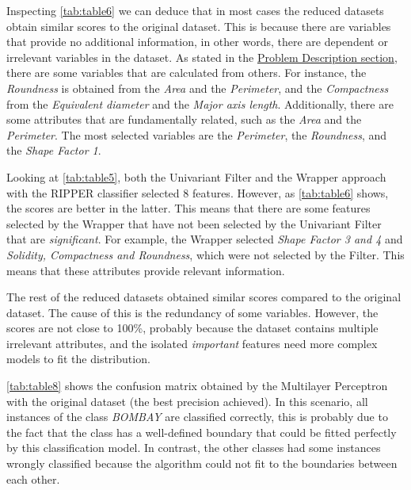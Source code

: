 \documentclass[a4paper,11pt]{article}
\begin{document}
Inspecting \autoref{tab:table6} we can deduce that in most cases the reduced datasets obtain similar scores to the original dataset. This is because there are variables that provide no additional information, in other words, there are dependent or irrelevant variables in the dataset. As stated in the \hyperref[sec:problem]{Problem Description section}, there are some variables that are calculated from others. For instance, the \textit{Roundness} is obtained from the \textit{Area} and the \textit{Perimeter}, and the \textit{Compactness} from the \textit{Equivalent diameter} and the \textit{Major axis length}. Additionally, there are some attributes that are fundamentally related, such as the \textit{Area} and the \textit{Perimeter}. The most selected variables are the \textit{Perimeter}, the \textit{Roundness}, and the \textit{Shape Factor 1}.

Looking at \autoref{tab:table5}, both the Univariant Filter and the Wrapper approach with the RIPPER classifier selected 8 features. However, as \autoref{tab:table6} shows, the scores are better in the latter. This means that there are some features selected by the Wrapper that have not been selected by the Univariant Filter that are \textit{significant}. For example, the Wrapper selected \textit{Shape Factor 3 and 4} and \textit{Solidity, Compactness and Roundness}, which were not selected by the Filter. This means that these attributes provide relevant information.

The rest of the reduced datasets obtained similar scores compared to the original dataset. The cause of this is the redundancy of some variables. However, the scores are not close to 100\%, probably because the dataset contains multiple irrelevant attributes, and the isolated \textit{important} features need more complex models to fit the distribution.

\autoref{tab:table8} shows the confusion matrix obtained by the Multilayer Perceptron with the original dataset (the best precision achieved). In this scenario, all instances of the class \textit{BOMBAY} are classified correctly, this is probably due to the fact that the class has a well-defined boundary that could be fitted perfectly by this classification model. In contrast, the other classes had some instances wrongly classified because the algorithm could not fit to the boundaries between each other.
\end{document}
